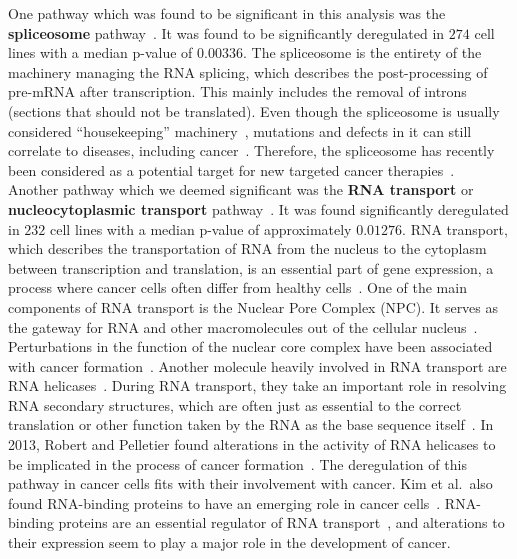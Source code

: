 One pathway which was found to be significant in this analysis was the \textbf{spliceosome} pathway~\cite{kegg_spliceosome}. It was found to be significantly deregulated in $274$ cell lines with a median p-value of $0.00336$. The spliceosome is the entirety of the machinery managing the RNA splicing, which describes the post-processing of pre-mRNA after transcription. This mainly includes the removal of introns (sections that should not be translated). Even though the spliceosome is usually considered ``housekeeping'' machinery~\cite{spliceosome}, mutations and defects in it can still correlate to diseases, including cancer~\cite{spliceosome}. Therefore, the spliceosome has recently been considered as a potential target for new targeted cancer therapies~\cite{epigenetics_alternative_splicing}.\\
Another pathway which we deemed significant was the \textbf{RNA transport} or \textbf{nucleocytoplasmic transport} pathway~\cite{kegg_rna_transport}.  It was found significantly deregulated in $232$ cell lines with a median p-value of approximately $0.01276$. RNA transport, which describes the transportation of RNA from the nucleus to the cytoplasm between transcription and translation, is an essential part of gene expression, a process where cancer cells often differ from healthy cells~\cite{hallmarks-of-cancer}.
One of the main components of RNA transport is the Nuclear Pore Complex (NPC). It serves as the gateway for RNA and other macromolecules out of the cellular nucleus~\cite{npc_structure}. Perturbations in the function of the nuclear core complex have been associated with cancer formation~\cite{npc_structure}. Another molecule heavily involved in RNA transport are RNA helicases~\cite{rna_helicases}. During RNA transport, they take an important role in resolving RNA secondary structures, which are often just as essential to the correct translation or other function taken by the RNA as the base sequence itself~\cite{rna_secondary_structure}.
In 2013, Robert and Pelletier found alterations in the activity of RNA helicases to be implicated in the process of cancer formation~\cite{rna_helicases}. The deregulation of this pathway in cancer cells fits with their involvement with cancer. Kim et al.\ also found RNA-binding proteins to have an emerging role in cancer cells~\cite{rnabp_cancer}. RNA-binding proteins are an essential regulator of RNA transport~\cite{rnabp_cancer}, and alterations to their expression seem to play a major role in the development of cancer.\\
